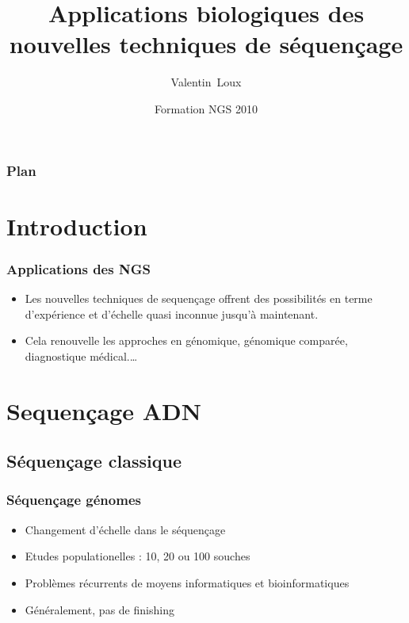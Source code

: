 \documentclass{beamer}
\title[Applications NGS] %
{Applications biologiques des nouvelles techniques de séquençage}
\author[V. Loux] %
{Valentin~Loux}
\institute[INRA-MIG] %
{
  Unité Mathématique, Informatique et Génome\\
  INRA, Jouy en Josas
}
\date[2 Novembre 2010] %
{Formation NGS 2010}
\begin{document}
	
	
\begin{frame}
  \titlepage
\end{frame}

\begin{frame}
  \frametitle{Plan}
  \tableofcontents
\end{frame}


\section{Introduction}

\begin{frame}
  \frametitle{Applications des NGS}
	\begin{itemize}
		\item Les nouvelles techniques de sequençage offrent des possibilités en terme d'expérience et d'échelle quasi inconnue jusqu'à maintenant.
		\item	Cela renouvelle les approches en génomique, génomique comparée, diagnostique médical.\ldots
	\end{itemize}
\end{frame}


\section{Sequençage ADN} %
\label{sec:sequençage_resequençage_massif}



\subsection{Séquençage classique} %
\label{sub:séquençage_classique_}



\begin{frame}
	\frametitle{Séquençage génomes}
\begin{itemize}
	\item Changement d'échelle dans le séquençage
	\item Etudes populationelles : 10, 20 ou 100 souches
	\item Problèmes récurrents de moyens informatiques et bioinformatiques
	\item Généralement, pas de finishing
\end{itemize}
\end{frame}
\end{document}
